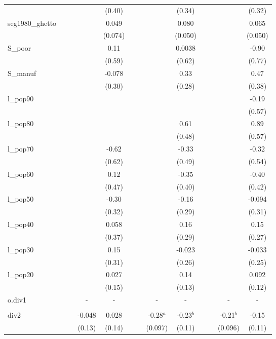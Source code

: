 \documentclass[]{article}
\begin{document}
\begin{tabular}{lcccccccccccc}
 &  &  &  & (0.40) &  &  &  & (0.34) &  &  &  & (0.32) \\
seg1980\_ghetto &  &  &  & 0.049 &  &  &  & 0.080 &  &  &  & 0.065 \\
 &  &  &  & (0.074) &  &  &  & (0.050) &  &  &  & (0.050) \\
S\_poor &  &  &  & 0.11 &  &  &  & 0.0038 &  &  &  & -0.90 \\
 &  &  &  & (0.59) &  &  &  & (0.62) &  &  &  & (0.77) \\
S\_manuf &  &  &  & -0.078 &  &  &  & 0.33 &  &  &  & 0.47 \\
 &  &  &  & (0.30) &  &  &  & (0.28) &  &  &  & (0.38) \\
l\_pop90 &  &  &  &  &  &  &  &  &  &  &  & -0.19 \\
 &  &  &  &  &  &  &  &  &  &  &  & (0.57) \\
l\_pop80 &  &  &  &  &  &  &  & 0.61 &  &  &  & 0.89 \\
 &  &  &  &  &  &  &  & (0.48) &  &  &  & (0.57) \\
l\_pop70 &  &  &  & -0.62 &  &  &  & -0.33 &  &  &  & -0.32 \\
 &  &  &  & (0.62) &  &  &  & (0.49) &  &  &  & (0.54) \\
l\_pop60 &  &  &  & 0.12 &  &  &  & -0.35 &  &  &  & -0.40 \\
 &  &  &  & (0.47) &  &  &  & (0.40) &  &  &  & (0.42) \\
l\_pop50 &  &  &  & -0.30 &  &  &  & -0.16 &  &  &  & -0.094 \\
 &  &  &  & (0.32) &  &  &  & (0.29) &  &  &  & (0.31) \\
l\_pop40 &  &  &  & 0.058 &  &  &  & 0.16 &  &  &  & 0.15 \\
 &  &  &  & (0.37) &  &  &  & (0.29) &  &  &  & (0.27) \\
l\_pop30 &  &  &  & 0.15 &  &  &  & -0.023 &  &  &  & -0.033 \\
 &  &  &  & (0.31) &  &  &  & (0.26) &  &  &  & (0.25) \\
l\_pop20 &  &  &  & 0.027 &  &  &  & 0.14 &  &  &  & 0.092 \\
 &  &  &  & (0.15) &  &  &  & (0.13) &  &  &  & (0.12) \\
o.div1 &  &  & - & - &  &  & - & - &  &  & - & - \\
 &  &  &  &  &  &  &  &  &  &  &  &  \\
div2 &  &  & -0.048 & 0.028 &  &  & -0.28$^a$ & -0.23$^b$ &  &  & -0.21$^b$ & -0.15 \\
 &  &  & (0.13) & (0.14) &  &  & (0.097) & (0.11) &  &  & (0.096) & (0.11) \\

\end{tabular}
\end{document}
